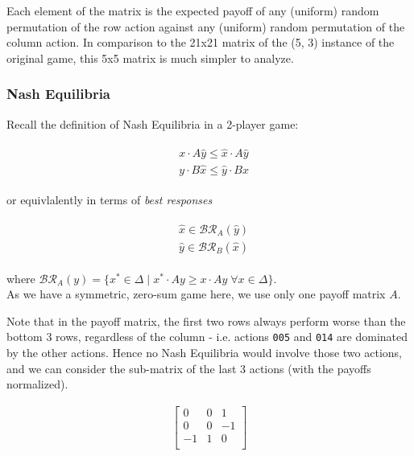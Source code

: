 \documentclass [11pt]{article}
\begin{document}
Each element of the matrix is the expected payoff of any (uniform) random permutation of the row action against any (uniform) random permutation of the column action. In comparison to the 21x21 matrix of the (5, 3) instance of the original game, this 5x5 matrix is much simpler to analyze.

\subsubsection{Nash Equilibria}

Recall the definition of Nash Equilibria in a 2-player game:

\begin{align}
  \begin{split}
    & x \cdot A \hat{y} \leq \hat{x} \cdot A \hat{y} \\
    & y \cdot B \hat{x} \leq \hat{y} \cdot B \hat{x}
  \end{split}
\end{align}

or equivlalently in terms of \textit{best responses}

\begin{align}
  \begin{split}
    & \hat{x} \in \mathcal{BR}_A( \hat{y} ) \\
    & \hat{y} \in \mathcal{BR}_B( \hat{x} )
  \end{split}
\end{align}

where $ \mathcal{BR}_A(y)  = \{ x^* \in \Delta \; | \; x^* \cdot A y \geq x \cdot A y \; \forall x \in \Delta  \} $.\\

As we have a symmetric, zero-sum game here, we use only one payoff matrix $A$.

Note that in the payoff matrix, the first two rows always perform worse than the bottom 3 rows, regardless of the column - i.e. actions \texttt{005} and \texttt{014} are dominated by the other actions. Hence no Nash Equilibria would involve those two actions, and we can consider the sub-matrix of the last 3 actions (with the payoffs normalized).

\begin{align}
  \begin{bmatrix}
    0 & 0 & 1 \\
    0 & 0 & -1 \\
    -1 & 1 & 0 \\
  \end{bmatrix}
\end{align}
\end{document}
